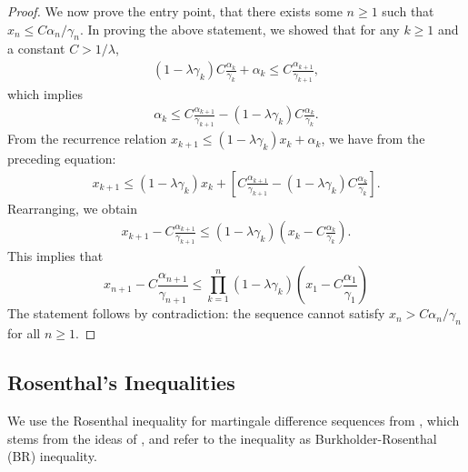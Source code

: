 \documentclass[11pt]{article}
\begin{document}
\begin{proof}
    We now prove the entry point, that there exists some $n \geq 1$ such that $x_n \leq C \alpha_n/\gamma_n$. 
    In proving the above statement, we showed that for any $k \geq 1$ and a constant $C > 1/\lambda$,
    \begin{align*}
        (1 - \lambda \gamma_k) C \frac{\alpha_k}{\gamma_k} + \alpha_k \leq C \frac{\alpha_{k+1}}{\gamma_{k+1}} ,
    \end{align*}
    which implies
    \begin{align*}
        \alpha_k \leq C \frac{\alpha_{k+1}}{\gamma_{k+1}} - (1 - \lambda \gamma_k) C \frac{\alpha_k}{\gamma_k} . 
    \end{align*}
    From the recurrence relation $x_{k+1} \leq (1 - \lambda \gamma_k) x_k + \alpha_k$, we have from the preceding equation:
    \begin{align*}
        x_{k+1} \leq (1 - \lambda \gamma_k) x_k + \left[ C \frac{\alpha_{k+1}}{\gamma_{k+1}} - (1 - \lambda \gamma_k) C \frac{\alpha_k}{\gamma_k}\right] . 
    \end{align*}
    Rearranging, we obtain
    \begin{align*}
        x_{k+1} - C \frac{\alpha_{k+1}}{\gamma_{k+1}}
        \leq (1 - \lambda \gamma_k) \left( x_k - C \frac{\alpha_k}{\gamma_k}\right) . 
    \end{align*}
    This implies that
    \begin{equation}
        x_{n+1} - C \frac{\alpha_{n+1}}{\gamma_{n+1}} \leq \prod_{k=1}^n (1 - \lambda \gamma_k) \left(x_1 - C \frac{\alpha_1}{\gamma_1}\right) 
    \end{equation}
    The statement follows by contradiction: the sequence cannot satisfy $x_{n} > C \alpha_n/\gamma_n$ for all $n \geq 1$. 
    
    
\end{proof}



\subsection{Rosenthal's Inequalities}\label{sec:BDG}
We use the Rosenthal inequality for martingale difference sequences from \citep{pinelis1994optimum}, which stems from the ideas of \citep{rosenthal1970subspaces,burkholder1973distribution}, and refer to the inequality as Burkholder-Rosenthal (BR) inequality. 
\end{document}
